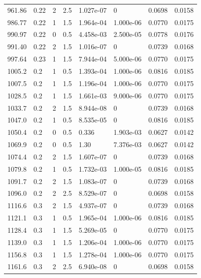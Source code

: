 \documentclass[preview]{standalone}
\begin{document}
{{\begin{tabular}{L{1.2cm}C{1.2cm} C{0.3cm}C{0.5cm} C{1.4cm}C{1.4cm} C{1.4cm}C{1.4cm}}
  961.86  &  0.22  & 2     & 2.5 &  1.027e-07  & 0  & 0.0698 &  0.0158   \\ 
  986.77  &  0.22  & 1     & 1.5 &  1.964e-04  & 1.000e-06  & 0.0770 &  0.0175   \\ 
  990.97  &  0.22  & 0     & 0.5 &  4.458e-03  & 2.500e-05  & 0.0778 &  0.0176   \\ 
  991.40  &  0.22  & 2     & 1.5 &  1.016e-07  & 0  & 0.0739 &  0.0168   \\ 
  997.64  &  0.23  & 1     & 1.5 &  7.944e-04  & 5.000e-06  & 0.0770 &  0.0175   \\ 
  1005.2  &   0.2  & 1     & 0.5 &  1.393e-04  & 1.000e-06  & 0.0816 &  0.0185   \\ 
  1007.5  &   0.2  & 1     & 1.5 &  1.196e-04  & 1.000e-06  & 0.0770 &  0.0175   \\ 
  1028.5  &   0.2  & 1     & 1.5 &  1.661e-03  & 9.000e-06  & 0.0770 &  0.0175   \\ 
  1033.7  &   0.2  & 2     & 1.5 &  8.944e-08  & 0  & 0.0739 &  0.0168   \\ 
  1047.0  &   0.2  & 1     & 0.5 &  8.535e-05  & 0  & 0.0816 &  0.0185   \\ 
  1050.4  &   0.2  & 0     & 0.5 &  0.336  & 1.903e-03  & 0.0627 &  0.0142   \\ 
  1069.9  &   0.2  & 0     & 0.5 &  1.30  & 7.376e-03  & 0.0627 &  0.0142   \\ 
  1074.4  &   0.2  & 2     & 1.5 &  1.607e-07  & 0  & 0.0739 &  0.0168   \\ 
  1079.8  &   0.2  & 1     & 0.5 &  1.732e-03  & 1.000e-05  & 0.0816 &  0.0185   \\ 
  1091.7  &   0.2  & 2     & 1.5 &  1.083e-07  & 0  & 0.0739 &  0.0168   \\ 
  1096.0  &   0.2  & 2     & 2.5 &  8.529e-07  & 0  & 0.0698 &  0.0158   \\ 
  1116.6  &   0.3  & 2     & 1.5 &  4.937e-07  & 0  & 0.0739 &  0.0168   \\ 
  1121.1  &   0.3  & 1     & 0.5 &  1.965e-04  & 1.000e-06  & 0.0816 &  0.0185   \\ 
  1128.4  &   0.3  & 1     & 1.5 &  5.269e-05  & 0  & 0.0770 &  0.0175   \\ 
  1139.0  &   0.3  & 1     & 1.5 &  1.206e-04  & 1.000e-06  & 0.0770 &  0.0175   \\ 
  1156.8  &   0.3  & 1     & 1.5 &  1.278e-04  & 1.000e-06  & 0.0770 &  0.0175   \\ 
  1161.6  &   0.3  & 2     & 2.5 &  6.940e-08  & 0  & 0.0698 &  0.0158   \\ 

\end{tabular}}}
\end{document}
